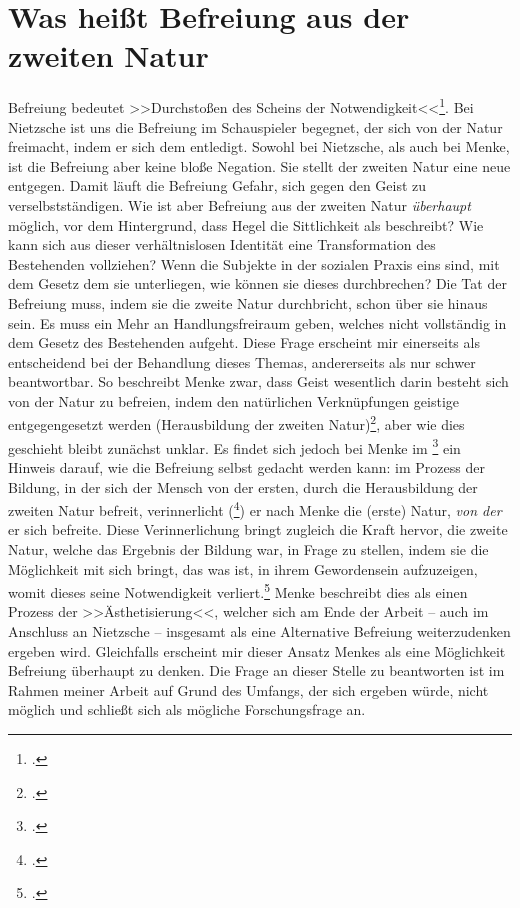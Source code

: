 \documentclass[12pt, a4paper, openany]{report}
\begin{document}
\section{Was heißt Befreiung aus der zweiten Natur}\label{abschnitt_3}
Befreiung bedeutet >>Durchstoßen des Scheins der Notwendigkeit<<\footcite[Vgl.][41]{menke_autonomie_2018}.
Bei Nietzsche ist uns die Befreiung im Schauspieler begegnet, der sich von der Natur freimacht, indem er sich dem  entledigt.
Sowohl bei Nietzsche, als auch bei Menke, ist die Befreiung aber keine bloße Negation. 
Sie stellt der  zweiten Natur eine neue entgegen.
Damit läuft die Befreiung Gefahr, sich gegen den Geist zu verselbstständigen. 
Wie ist aber Befreiung aus der zweiten Natur \emph{überhaupt} möglich, vor dem Hintergrund, dass Hegel die Sittlichkeit als  beschreibt?
Wie kann sich aus dieser verhältnislosen Identität eine Transformation des Bestehenden vollziehen?
Wenn die Subjekte in der sozialen Praxis eins sind, mit dem Gesetz dem sie unterliegen, wie können sie dieses durchbrechen? 
Die Tat der Befreiung muss, indem sie die zweite Natur durchbricht, schon über sie hinaus sein.
Es muss ein Mehr an Handlungsfreiraum geben, welches nicht vollständig in dem Gesetz des Bestehenden aufgeht.
Diese Frage erscheint mir einerseits als entscheidend bei der Behandlung dieses Themas, andererseits als nur schwer beantwortbar.
So beschreibt Menke zwar, dass Geist wesentlich darin besteht sich von der Natur zu befreien, indem den natürlichen Verknüpfungen geistige entgegengesetzt werden (Herausbildung der zweiten Natur)\footcite[Vgl.][39]{menke_autonomie_2018}, aber wie dies geschieht bleibt zunächst unklar. 
Es findet sich jedoch bei Menke im \footcite[][51]{menke_autonomie_2018} ein Hinweis darauf, wie die Befreiung selbst gedacht werden kann:
im Prozess der Bildung, in der sich der Mensch von der ersten, durch die Herausbildung der zweiten Natur befreit, verinnerlicht (\footcite[][80]{menke_autonomie_2018}) er nach Menke die (erste) Natur, \emph{von der} er sich befreite.
Diese Verinnerlichung bringt zugleich die Kraft hervor, die zweite Natur, welche das Ergebnis der Bildung war, in Frage zu stellen, indem sie die Möglichkeit mit sich bringt, das was ist, in ihrem Gewordensein aufzuzeigen, womit dieses seine Notwendigkeit verliert.\footcite[Vgl.][80]{menke_autonomie_2018}
Menke beschreibt dies als einen Prozess der >>Ästhetisierung<<, welcher sich am Ende der Arbeit -- auch im Anschluss an Nietzsche -- insgesamt als eine Alternative Befreiung weiterzudenken ergeben wird. 
Gleichfalls erscheint mir dieser Ansatz Menkes als eine Möglichkeit Befreiung überhaupt zu denken. 
Die Frage an dieser Stelle zu beantworten ist im Rahmen meiner Arbeit auf Grund des Umfangs, der sich ergeben würde, nicht möglich und schließt sich als mögliche Forschungsfrage an.
\end{document}
